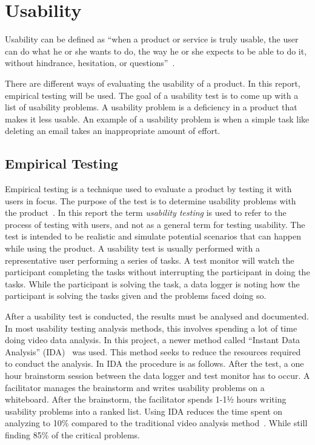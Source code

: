 \section{Usability}
\label{sub:usability}

Usability can be defined as \enquote{when a product or service is truly usable, the user can do what he or she wants to do, the way he or she expects to be able to do it, without hindrance, hesitation, or questions}~\cite{RubinChisnellSpool08}.

There are different ways of evaluating the usability of a product. In
this report, empirical testing will be used. The goal of a usability test is to come up with a list of usability problems. A usability problem is a deficiency in a product that makes it less usable. An example of a usability problem is when a simple task like deleting an email takes an inappropriate amount of effort.

\subsection{Empirical Testing}
\label{sub:usabilityTesting}
Empirical testing is a technique used to evaluate a product by testing it with users in focus. The purpose of the test is to determine usability problems with the product~\cite{RubinChisnellSpool08}. In this report the term \emph{usability testing} is used to refer to the process of testing with users, and not as a general term for testing usability. The test is intended to be realistic and simulate potential scenarios that can happen while using the product. A usability test is usually performed with a representative user performing a series of tasks. A test monitor will watch the participant completing the tasks without interrupting the participant in doing the tasks. While the participant is solving the task, a data logger is noting how the participant is solving the tasks given and the problems faced doing so.

After a usability test is conducted, the results must be analysed and documented. In most usability testing analysis methods, this involves spending a lot of time doing video data analysis. In this project, a newer method called \enquote{Instant Data Analysis} (IDA)~\cite{kjeldskov2004instant} was used. This method seeks to reduce the resources required to conduct the analysis. In IDA the procedure is as follows. After the test, a one hour brainstorm session between the data logger and test monitor has to occur. A facilitator manages the brainstorm and writes usability problems on a whiteboard. After the brainstorm, the facilitator spends 1-1½ hours writing usability problems into a ranked list. Using IDA reduces the time spent on analyzing to 10\% compared to the traditional video analysis method~\cite{kjeldskov2004instant}. While still finding 85\% of the critical problems.

